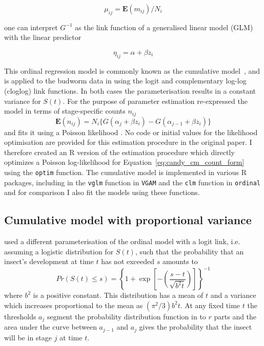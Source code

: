 $$\mu_{ij} = \mathbf{E}(m_{ij})/N_i$$

 one can interpret $G^{-1}$ as the link function of a generalised linear model (GLM) with the linear predictor 

$$\eta_{ij}=\alpha+\beta z_i$$

This ordinal regression model is commonly known as the cumulative model~\citep{burkner2019ordinal}, and is applied to the budworm data in \citep{candy1991modeling} using the logit and complementary log-log (cloglog) link functions. 
In both cases the parameterisation results in a constant variance for $S(t)$.
For the purpose of parameter estimation \citet{candy1991modeling} re-expressed the model in terms of stage-specific counts $n_{ij}$  
\begin{equation}
\mathbf{E}(n_{ij})=N_i\{G(\alpha_j + \beta z_i) - G(\alpha_{j-1} + \beta z_i)\}
\label{eq:candy_cm_count_form}
\end{equation}
and fits it using a Poisson likelihood \citep{thompson1981composite}. 
No code or initial values for the likelihood optimisation are provided for this estimation procedure in the original paper.   
I therefore created an R version of the estimation procedure which directly optimizes a Poisson log-likelihood for Equation~\ref{eq:candy_cm_count_form} using the \verb+optim+ function.
 The cumulative model is implemented in various R packages, including in the \verb+vglm+ function in \verb+VGAM+ \citep{VGAM} and the \verb+clm+ function in \verb+ordinal+ \cite{ordinal} and for comparison I also fit the models using these functions.

\subsection{Cumulative model with proportional variance}
\citet{dennis1986stochastic} used a different parameterisation of the ordinal model with a logit link, i.e. assuming a logistic distribution for $S(t)$, such that the probability that an insect's development at time $t$ has not exceeded $s$ amounts to 
\begin{equation}
Pr(S(t) \leq s) = \left\{ 1 + \exp\left[-\left(\frac{s-t}{\sqrt{b^2t}}\right)\right]\right\}^{-1}
\end{equation}
where $b^2$ is a positive constant. 
This distribution has a mean of $t$ and a variance which increases proportional to the mean as $(\pi^2/3)b^2t$.
At any fixed time $t$ the thresholds $a_j$ segment the probability distribution function in to $r$ parts and the area under the curve between $a_{j-1}$ and $a_j$ gives the probability that the insect will be in stage $j$ at time $t$.

